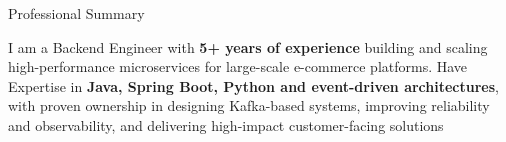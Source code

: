 \begin{cvsection}{Professional Summary}

I am a Backend Engineer with {\bf 5+ years of experience} building and scaling high-performance microservices for large-scale e-commerce platforms. Have Expertise in {\bf Java, Spring Boot, Python and event-driven architectures}, with proven ownership in designing Kafka-based systems, improving reliability and observability, and delivering high-impact customer-facing solutions


\end{cvsection}